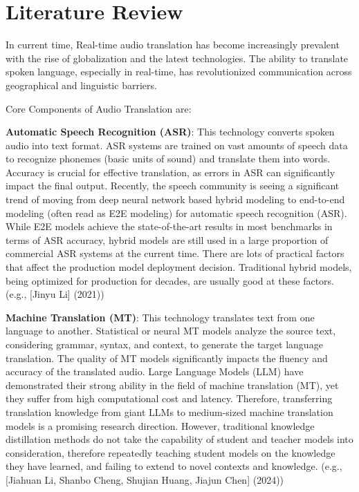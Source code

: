 \documentclass[12px, a4paper]{article}
\begin{document}
\section{Literature Review}
In current time, Real-time audio translation has become increasingly prevalent with the rise of globalization and the latest technologies. The ability to translate spoken language, especially in real-time, has revolutionized communication across geographical and linguistic barriers. 

Core Components of Audio Translation are:

\textbf{Automatic Speech Recognition (ASR)}: This technology converts spoken audio into text format. ASR systems are trained on vast amounts of speech data to recognize phonemes (basic units of sound) and translate them into words. Accuracy is crucial for effective translation, as errors in ASR can significantly impact the final output. Recently, the speech community is seeing a significant trend of moving from deep neural network based hybrid modeling to end-to-end modeling (often read as E2E modeling) for automatic speech recognition (ASR). While E2E models achieve the state-of-the-art results in most benchmarks in terms of ASR accuracy, hybrid models are still used in a large proportion of commercial ASR systems at the current time. There are lots of practical factors that affect the production model deployment decision. Traditional hybrid models, being optimized for production for decades, are usually good at these factors. (e.g., [Jinyu Li] (2021))

\textbf{Machine Translation (MT)}: This technology translates text from one language to another. Statistical or neural MT models analyze the source text, considering grammar, syntax, and context, to generate the target language translation. The quality of MT models significantly impacts the fluency and accuracy of the translated audio. Large Language Models (LLM) have demonstrated their strong ability in the field of machine translation (MT), yet they suffer from high computational cost and latency. Therefore, transferring translation knowledge from giant LLMs to medium-sized machine translation models is a promising research direction. However, traditional knowledge distillation methods do not take the capability of student and teacher models into consideration, therefore repeatedly teaching student models on the knowledge they have learned, and failing to extend to novel contexts and knowledge. (e.g., [Jiahuan Li, Shanbo Cheng, Shujian Huang, Jiajun Chen] (2024))
\end{document}
